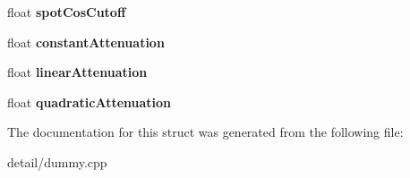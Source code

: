 \begin{DoxyCompactItemize}
\item 
\hypertarget{structlight_a25376f0a1e32235d50ef14edfa18bfb3}{float {\bfseries spot\-Cos\-Cutoff}}\label{structlight_a25376f0a1e32235d50ef14edfa18bfb3}

\item 
\hypertarget{structlight_a788e3a9fbc05cd748dd6a181b6043892}{float {\bfseries constant\-Attenuation}}\label{structlight_a788e3a9fbc05cd748dd6a181b6043892}

\item 
\hypertarget{structlight_aea11b1222a4d5c42f5d69e31751e6fac}{float {\bfseries linear\-Attenuation}}\label{structlight_aea11b1222a4d5c42f5d69e31751e6fac}

\item 
\hypertarget{structlight_afe2993ec0463d57b374b8f5a27f2dfa7}{float {\bfseries quadratic\-Attenuation}}\label{structlight_afe2993ec0463d57b374b8f5a27f2dfa7}

\end{DoxyCompactItemize}


The documentation for this struct was generated from the following file\-:\begin{DoxyCompactItemize}
\item 
detail/dummy.\-cpp\end{DoxyCompactItemize}
